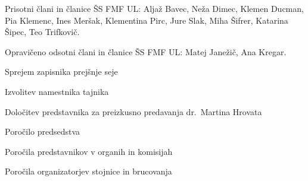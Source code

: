 \documentclass{seja}
\begin{document}
Prisotni člani in članice ŠS FMF UL:
Aljaž Bavec,
Neža Dimec,
Klemen Ducman,
Pia Klemenc,
Ines Meršak,
Klementina Pirc,
Jure Slak,
Miha Šifrer,
Katarina Šipec,
Teo Trifkovič.

Opravičeno odsotni člani in članice ŠS FMF UL:
Matej Janežič, Ana Kregar.


\begin{red*}
  \item Sprejem zapisnika prejšnje seje
  \item Izvolitev namestnika tajnika
  \item Določitev predstavnika za preizkusno predavanja dr.~Martina Hrovata
  \item Poročilo predsedstva
  \item Poročila predstavnikov v organih in komisijah
  \item Poročila organizatorjev stojnice in brucovanja
\end{red*}
\end{document}
